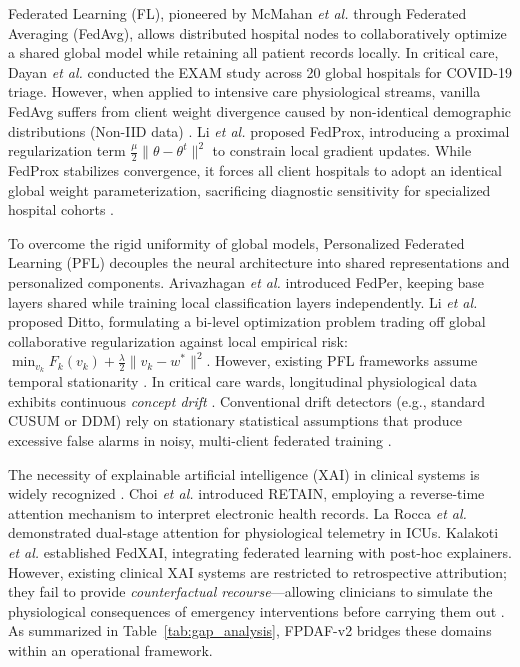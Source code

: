 \documentclass[journal,twocolumn,10pt]{IEEEtran}
\begin{document}
Federated Learning (FL), pioneered by McMahan \textit{et al.} \cite{mcmahan2017} through Federated Averaging (FedAvg), allows distributed hospital nodes to collaboratively optimize a shared global model while retaining all patient records locally. In critical care, Dayan \textit{et al.} \cite{dayan2021exam} conducted the EXAM study across 20 global hospitals for COVID-19 triage. However, when applied to intensive care physiological streams, vanilla FedAvg suffers from client weight divergence caused by non-identical demographic distributions (Non-IID data) \cite{li2020fedprox,tang2025horizon}. Li \textit{et al.} \cite{li2020fedprox} proposed FedProx, introducing a proximal regularization term $\frac{\mu}{2} \|\theta - \theta^t\|^2$ to constrain local gradient updates. While FedProx stabilizes convergence, it forces all client hospitals to adopt an identical global weight parameterization, sacrificing diagnostic sensitivity for specialized hospital cohorts \cite{arivazhagan2020,wang2025personalized}.

To overcome the rigid uniformity of global models, Personalized Federated Learning (PFL) decouples the neural architecture into shared representations and personalized components. Arivazhagan \textit{et al.} \cite{arivazhagan2020} introduced FedPer, keeping base layers shared while training local classification layers independently. Li \textit{et al.} \cite{li2021ditto} proposed Ditto, formulating a bi-level optimization problem trading off global collaborative regularization against local empirical risk: $\min_{v_k} F_k(v_k) + \frac{\lambda}{2} \|v_k - w^*\|^2$. However, existing PFL frameworks assume temporal stationarity \cite{wang2025personalized,yuan2024trend}. In critical care wards, longitudinal physiological data exhibits continuous \textit{concept drift} \cite{jothimurugesan2022,bernardi2023adaptive}. Conventional drift detectors (e.g., standard CUSUM or DDM) rely on stationary statistical assumptions that produce excessive false alarms in noisy, multi-client federated training \cite{bernardi2023adaptive}.

The necessity of explainable artificial intelligence (XAI) in clinical systems is widely recognized \cite{lundberg2018explainable,sundararajan2017axiomatic}. Choi \textit{et al.} \cite{choi2016retain} introduced RETAIN, employing a reverse-time attention mechanism to interpret electronic health records. La Rocca \textit{et al.} \cite{larocca2021attention} demonstrated dual-stage attention for physiological telemetry in ICUs. Kalakoti \textit{et al.} \cite{kalakoti2025fedxai} established FedXAI, integrating federated learning with post-hoc explainers. However, existing clinical XAI systems are restricted to retrospective attribution; they fail to provide \textit{counterfactual recourse}---allowing clinicians to simulate the physiological consequences of emergency interventions before carrying them out \cite{larocca2022shap}. As summarized in Table~\ref{tab:gap_analysis}, FPDAF-v2 bridges these domains within an operational framework.
\end{document}
